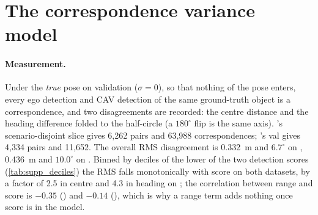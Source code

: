 \begin{table}[t]
  \centering\small
  \caption{\textbf{\freealign's edge threshold on validation and test.} \vxreal: val  sweep mean (3 seeds), $\sigma{=}0$ coverage, and the test sweep mean where it was run; the other parameters are the MAE winner's. \opvv: val MAE at $\sigma{=}\SI{1}{m}$ and val  sweep mean. Sources: \texttt{freealign\_calibration\_*\_result.json}, \texttt{B\_boxes\_only\_fathr*\_val}, \texttt{B\_boxes\_only\_faap*\_test}, \texttt{fathr*\_val\_result.json}.}
  \label{tab:supp_fathr}
\end{table}

\section{The correspondence variance model}
\label{sec:supp_variance}

\paragraph{Measurement.}
Under the \emph{true} pose on validation ($\sigma{=}0$), so that nothing of the pose enters, every ego detection and CAV detection of the same ground-truth object is a correspondence, and two disagreements are recorded: the centre distance and the heading difference folded to the half-circle (a $180^\circ$ flip is the same axis). \opvv's scenario-disjoint slice gives 6,262 pairs and 63,988 correspondences; \vxreal's val gives 4,334 pairs and 11,652. The overall RMS disagreement is \SI{0.332}{m} and $6.7^\circ$ on \opvv, \SI{0.436}{m} and $10.0^\circ$ on \vxreal. Binned by deciles of the lower of the two detection scores (\cref{tab:supp_deciles}) the RMS falls monotonically with score on both datasets, by a factor of 2.5 in centre and 4.3 in heading on \opvv; the correlation between range and score is $-0.35$ (\opvv) and $-0.14$ (\vxreal), which is why a range term adds nothing once score is in the model.

